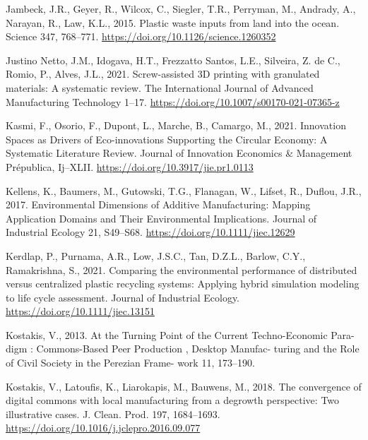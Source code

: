 \documentclass[12pt]{elsarticle} %
\newlength{\cslhangindent}
\newlength{\cslentryspacingunit} %
\newenvironment{CSLReferences}[2] %
 {%
  \setlength{\parindent}{0pt}
  \ifodd #1
  \let\oldpar\par
  \def\par{\hangindent=\cslhangindent\oldpar}
  \fi
  \setlength{\parskip}{#2\cslentryspacingunit}
 }%
 {}
\begin{document}
\begin{CSLReferences}{1}{0}
\leavevmode{}%
Jambeck, J.R., Geyer, R., Wilcox, C., Siegler, T.R., Perryman, M., Andrady, A., Narayan, R., Law, K.L., 2015. Plastic waste inputs from land into the ocean. Science 347, 768--771. \url{https://doi.org/10.1126/science.1260352}

\leavevmode{}%
Justino Netto, J.M., Idogava, H.T., Frezzatto Santos, L.E., Silveira, Z. de C., Romio, P., Alves, J.L., 2021. Screw-assisted {3D} printing with granulated materials: A systematic review. The International Journal of Advanced Manufacturing Technology 1--17. \url{https://doi.org/10.1007/s00170-021-07365-z}

\leavevmode{}%
Kasmi, F., Osorio, F., Dupont, L., Marche, B., Camargo, M., 2021. Innovation {Spaces} as {Drivers} of {Eco-innovations Supporting} the {Circular Economy}: {A Systematic Literature Review}. Journal of Innovation Economics \& Management Prépublica, Ij--XLII. \url{https://doi.org/10.3917/jie.pr1.0113}

\leavevmode{}%
Kellens, K., Baumers, M., Gutowski, T.G., Flanagan, W., Lifset, R., Duflou, J.R., 2017. Environmental {Dimensions} of {Additive Manufacturing}: {Mapping Application Domains} and {Their Environmental Implications}. Journal of Industrial Ecology 21, S49--S68. \url{https://doi.org/10.1111/jiec.12629}

\leavevmode{}%
Kerdlap, P., Purnama, A.R., Low, J.S.C., Tan, D.Z.L., Barlow, C.Y., Ramakrishna, S., 2021. Comparing the environmental performance of distributed versus centralized plastic recycling systems: {Applying} hybrid simulation modeling to life cycle assessment. Journal of Industrial Ecology. \url{https://doi.org/10.1111/jiec.13151}

\leavevmode{}%
Kostakis, V., 2013. At the {Turning Point} of the {Current Techno-Economic Para-} digm : {Commons-Based Peer Production} , {Desktop Manufac-} turing and the {Role} of {Civil Society} in the {Perezian Frame-} work 11, 173--190.

\leavevmode{}%
Kostakis, V., Latoufis, K., Liarokapis, M., Bauwens, M., 2018. The convergence of digital commons with local manufacturing from a degrowth perspective: {Two} illustrative cases. J. Clean. Prod. 197, 1684--1693. \url{https://doi.org/10.1016/j.jclepro.2016.09.077}


\end{CSLReferences}
\end{document}
